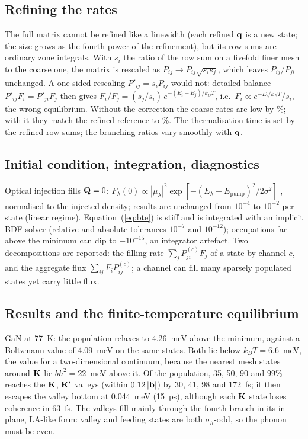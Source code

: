 \subsection{Refining the rates}
The full matrix cannot be refined like a linewidth (each refined $\mathbf{q}$ is a new
state; the size grows as the fourth power of the refinement), but its row sums
are ordinary zone integrals. With $s_i$ the ratio of the row sum on a fivefold
finer mesh to the coarse one, the matrix is rescaled as
$P_{ij}\to P_{ij}\sqrt{s_is_j}$, which leaves $P_{ij}/P_{ji}$ unchanged. A
one-sided rescaling $P'_{ij}=s_iP_{ij}$ would not: detailed balance
$P'_{ij}F_i=P'_{ji}F_j$ then gives $F_i/F_j=(s_j/s_i)\,e^{-(E_i-E_j)/k_BT}$, i.e.\
$F_i\propto e^{-E_i/k_BT}/s_i$, the wrong equilibrium. Without the correction the
coarse rates are low by \tbd{2.5}\%; with it they match the refined reference to
\tbd{X}\%. The thermalisation time is set by the refined row sums; the
branching ratios vary smoothly with $\mathbf{q}$.

\subsection{Initial condition, integration, diagnostics}
Optical injection fills $\mathbf{Q}=0$:
$F_\lambda(0)\propto|\mu_\lambda|^2\exp[-(E_\lambda-E_{\mathrm{pump}})^2/2\sigma^2]$
\tbd{(pump as in the main text)}, normalised to the injected density; results are
unchanged from $10^{-4}$ to $10^{-2}$ per state (linear regime). Equation~(\ref{eq:bte})
is stiff and is integrated with an implicit BDF solver (relative and absolute
tolerances $10^{-7}$ and $10^{-12}$); occupations far above the minimum can dip to
$-10^{-15}$, an integrator artefact. Two decompositions are reported: the filling
rate $\sum_jP^{(c)}_{ji}F_j$ of a state by channel $c$, and the aggregate flux
$\sum_{ij}F_iP^{(c)}_{ij}$; a channel can fill many sparsely populated states yet
carry little flux.

\subsection{Results and the finite-temperature equilibrium}
GaN at 77~K: the population relaxes to 4.26~meV above the minimum, against a
Boltzmann value of 4.09~meV on the same states. Both lie below $k_BT=6.6$~meV, the
value for a two-dimensional continuum, because the nearest mesh states around
$\mathbf{K}$ lie $b h^2=22$~meV above it. Of the population, 35, 50, 90 and 99\% reaches
the $\mathbf{K}$, $\mathbf{K}'$ valleys (within $0.12\,|\mathbf{b}|$) by 30, 41, 98 and 172~fs; it then
escapes the valley bottom at 0.044~meV (15~ps), although each $\mathbf{K}$ state loses
coherence in 63~fs. The valleys fill mainly through the fourth branch in its
in-plane, LA-like form: valley and feeding states are both $\sigma_h$-odd, so the
phonon must be even.

